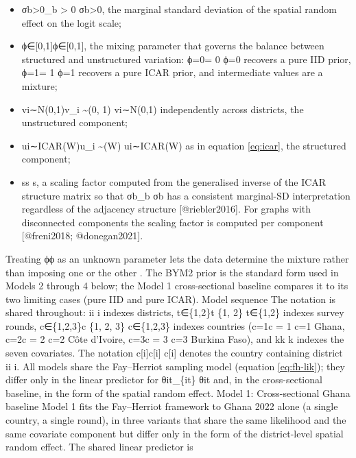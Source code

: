 \documentclass{article}
\begin{document}
\begin{itemize}

\item σb>0\sigma_b > 0
σb​>0, the marginal standard deviation of the spatial random effect on the logit scale;

\item ϕ∈[0,1]\phi \in [0, 1]
ϕ∈[0,1], the mixing parameter that governs the balance between structured and unstructured variation: ϕ=0\phi = 0
ϕ=0 recovers a pure IID prior, ϕ=1\phi = 1
ϕ=1 recovers a pure ICAR prior, and intermediate values are a mixture;

\item vi∼N(0,1)v_i \sim {}(0, 1)
vi​∼N(0,1) independently across districts, the unstructured component;

\item ui∼ICAR(W)u_i \sim {}(W)
ui​∼ICAR(W) as in equation \ref{eq:icar}, the structured component;

\item ss
s, a scaling factor computed from the generalised inverse of the ICAR structure matrix so that σb\sigma_b
σb​ has a consistent marginal-SD interpretation regardless of the adjacency structure [@riebler2016]. For graphs with disconnected components the scaling factor is computed per component [@freni2018; @donegan2021].

\end{itemize}

Treating ϕ\phi ϕ as an unknown parameter lets the data determine the
mixture rather than imposing one or the other \citep{morris2019}. The
BYM2 prior is the standard form used in Models 2 through 4 below; the
Model 1 cross-sectional baseline compares it to its two limiting cases
(pure IID and pure ICAR). Model sequence \label{sec:models} The notation
is shared throughout: ii i indexes districts, t∈\{1,2\}t \in \{1, 2\}
t∈\{1,2\} indexes survey rounds, c∈\{1,2,3\}c \in \{1, 2, 3\}
c∈\{1,2,3\} indexes countries (c=1c = 1 c=1 Ghana, c=2c = 2 c=2 Côte
d'Ivoire, c=3c = 3 c=3 Burkina Faso), and kk k indexes the seven
covariates. The notation c{[}i{]}c{[}i{]} c{[}i{]} denotes the country
containing district ii i. All models share the Fay--Herriot sampling
model (equation \ref{eq:fh-lik}); they differ only in the linear
predictor for θit\theta\_\{it\} θit\hspace{0pt} and, in the
cross-sectional baseline, in the form of the spatial random effect.
Model 1: Cross-sectional Ghana baseline \label{sec:m1} Model 1 fits the
Fay--Herriot framework to Ghana 2022 alone (a single country, a single
round), in three variants that share the same likelihood and the same
covariate component but differ only in the form of the district-level
spatial random effect. The shared linear predictor is
\end{document}
